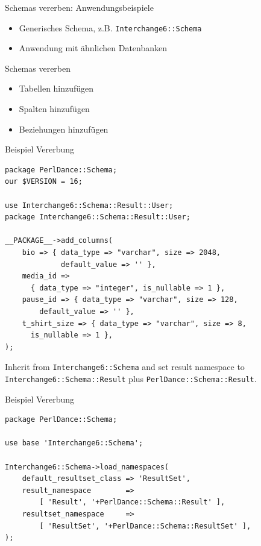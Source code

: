 \begin{frame}[fragile]{Schemas vererben: Anwendungsbeispiele}
\begin{itemize}
\item Generisches Schema, z.B. \verb|Interchange6::Schema|
\item Anwendung mit ähnlichen Datenbanken
\end{itemize}
\end{frame}

\begin{frame}{Schemas vererben}
\begin{itemize}
\item Tabellen hinzufügen
\item Spalten hinzufügen
\item Beziehungen hinzufügen
\end{itemize}
\end{frame}

\begin{frame}[fragile]{Beispiel Vererbung}
\begin{lstlisting}
package PerlDance::Schema;
our $VERSION = 16;

use Interchange6::Schema::Result::User;
package Interchange6::Schema::Result::User;

__PACKAGE__->add_columns(
    bio => { data_type => "varchar", size => 2048, 
             default_value => '' },
    media_id =>
      { data_type => "integer", is_nullable => 1 },
    pause_id => { data_type => "varchar", size => 128, 
        default_value => '' },
    t_shirt_size => { data_type => "varchar", size => 8, 
      is_nullable => 1 },
);
\end{lstlisting}
\end{frame}

Inherit from \verb|Interchange6::Schema| and set result namespace to 
\verb|Interchange6::Schema::Result| plus \verb|PerlDance::Schema::Result|.

\begin{frame}[fragile]{Beispiel Vererbung}
\begin{lstlisting}
package PerlDance::Schema;

use base 'Interchange6::Schema';

Interchange6::Schema->load_namespaces(
    default_resultset_class => 'ResultSet',
    result_namespace        =>
        [ 'Result', '+PerlDance::Schema::Result' ],
    resultset_namespace     =>
        [ 'ResultSet', '+PerlDance::Schema::ResultSet' ],
);
\end{lstlisting}
\end{frame}

